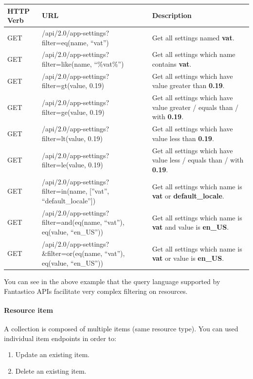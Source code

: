 \documentclass[letterpaper,10pt,english]{sphinxmanual}
\begin{document}
\begin{tabulary}{\linewidth}{|L|L|L|}
\hline

\textbf{HTTP Verb}
 & 
\textbf{URL}
 & 
\textbf{Description}
\\\hline

GET
 & 
/api/2.0/app-settings?filter=eq(name, ``vat'')
 & 
Get all settings named \textbf{vat}.
\\\hline

GET
 & 
/api/2.0/app-settings?filter=like(name, ``\%vat\%'')
 & 
Get all settings which name contains \textbf{vat}.
\\\hline

GET
 & 
/api/2.0/app-settings?filter=gt(value, 0.19)
 & 
Get all settings which have value greater than \textbf{0.19}.
\\\hline

GET
 & 
/api/2.0/app-settings?filter=ge(value, 0.19)
 & 
Get all settings which have value greater / equals than / with \textbf{0.19}.
\\\hline

GET
 & 
/api/2.0/app-settings?filter=lt(value, 0.19)
 & 
Get all settings which have value less than \textbf{0.19}.
\\\hline

GET
 & 
/api/2.0/app-settings?filter=le(value, 0.19)
 & 
Get all settings which have value less / equals than / with \textbf{0.19}.
\\\hline

GET
 & 
/api/2.0/app-settings?filter=in(name, {[}''vat'', ``default\_locale''{]})
 & 
Get all settings which name is \textbf{vat} or \textbf{default\_locale}.
\\\hline

GET
 & 
/api/2.0/app-settings?filter=and(eq(name, ``vat''), eq(value, ``en\_US''))
 & 
Get all settings which name is \textbf{vat} and value is \textbf{en\_US}.
\\\hline

GET
 & 
/api/2.0/app-settings?\&filter=or(eq(name, ``vat''), eq(value, ``en\_US''))
 & 
Get all settings which name is \textbf{vat} or value is \textbf{en\_US}.
\\\hline
\end{tabulary}


You can see in the above example that the query language supported by Fantastico APIs facilitate very complex filtering on resources.


\paragraph{Resource item}
\label{features/roa/rest_standard:resource-item}
A collection is composed of multiple items (same resource type). You can used individual item endpoints in order to:
\begin{enumerate}
\item {} 
Update an existing item.

\item {} 
Delete an existing item.

\end{enumerate}
\end{document}
